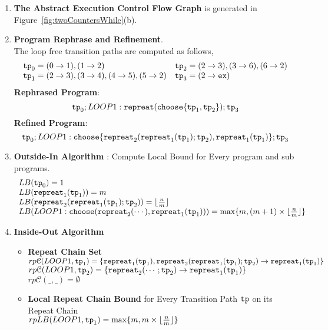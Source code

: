 \begin{enumerate}
  \item  \textbf{The Abstract Execution Control Flow Graph} is generated in Figure~\ref{fig:twoCountersWhile}(b).

  \item \textbf{Program Rephrase and Refinement}. 
  \\
  The loop free transition paths are computed as follows,
  \[
    \begin{array}{ll}
\mathtt{tp}_0 = (0 \to 1), (1 \to 2)
&
\mathtt{tp}_2 = (2 \to 3), (3 \to 6), (6 \to 2)
\\
\mathtt{tp}_1 = (2 \to 3), (3 \to 4), (4 \to 5), (5 \to 2)
&
\mathtt{tp}_3 = (2 \to \mathtt{ex})
\end{array}
\]
\textbf{Rephrased Program}:
\[
\mathtt{tp}_0 ; LOOP1: \mathtt{repreat}(\mathtt{choose}\{\mathtt{tp}_1, \mathtt{tp}_2 \}); \mathtt{tp}_3
\]
\textbf{Refined Program}:
\[
  \mathtt{tp}_0 ; LOOP1: \mathtt{choose}\{\mathtt{repreat}_2(\mathtt{repreat}_1(\mathtt{tp}_1); \mathtt{tp}_2) , \mathtt{repreat}_1(\mathtt{tp}_1) \}; \mathtt{tp}_3
  \]
  \item \textbf{Outside-In Algorithm} : Compute Local Bound for Every program and sub programs.
  \[
    \begin{array}{l}
        LB(\mathtt{tp}_0) = 1
        \\
        LB(\mathtt{repreat}_1(\mathtt{tp}_1)) = m 
        \\
        LB(\mathtt{repreat}_2(\mathtt{repreat}_1(\mathtt{tp}_1); \mathtt{tp}_2)) = \lfloor\frac{n}{m}\rfloor
        \\
        LB(LOOP1: \mathtt{choose}(\mathtt{repreat}_2(\cdots), \mathtt{repreat}_1(\mathtt{tp}_1))) 
        = \max\{m, (m  + 1)\times \lfloor\frac{n}{m}\rfloor\}
\end{array}
\]
\item \textbf{Inside-Out Algorithm}
\begin{itemize}
  \item \textbf{Repeat Chain Set}
  \\
  $rp\mathcal{C}(LOOP1, \mathtt{tp}_1) = \{\mathtt{repreat}_1(\mathtt{tp}_1), \mathtt{repreat}_2(\mathtt{repreat}_1(\mathtt{tp}_1); \mathtt{tp}_2) \to \mathtt{repreat}_1(\mathtt{tp}_1)\}$ \\
  $rp\mathcal{C}(LOOP1, \mathtt{tp}_2) = \{\mathtt{repreat}_2(\cdots; \mathtt{tp}_2) \to \mathtt{repreat}_1(\mathtt{tp}_1)\}$ \\
  $rp\mathcal{C}(\_, \_) = \emptyset$ 
  \item \textbf{{Local Repeat Chain Bound} }for Every Transition Path $\mathtt{tp}$ on its Repeat Chain
  \\
  $rpLB(LOOP1, \mathtt{tp}_1) = \max\{m, m \times \lfloor\frac{n}{m}\rfloor\}$ \\

\end{itemize}
\end{enumerate}

